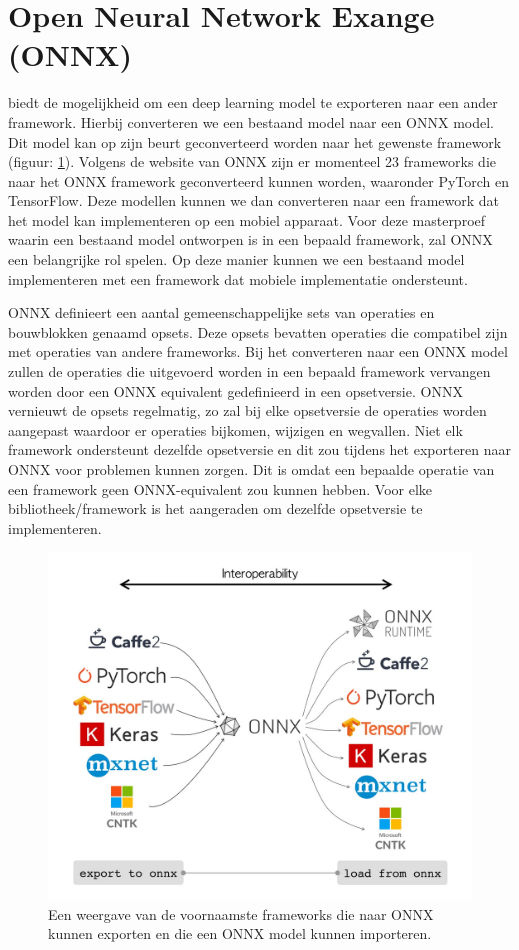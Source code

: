 \section{Open Neural Network Exange (ONNX)}
\cite{onnx_onnx_2017} biedt de mogelijkheid om een deep learning model te exporteren naar een ander framework.
Hierbij converteren we een bestaand model naar een ONNX model.
Dit model kan op zijn beurt geconverteerd worden naar het gewenste framework (figuur: \ref{fig:onnx}).
Volgens de website van ONNX zijn er momenteel 23 frameworks die naar het ONNX framework geconverteerd kunnen worden, waaronder PyTorch en TensorFlow.
Deze modellen kunnen we dan converteren naar een framework dat het model kan implementeren op een mobiel apparaat.
Voor deze masterproef waarin een bestaand model ontworpen is in een bepaald framework, zal ONNX een belangrijke rol spelen.
Op deze manier kunnen we een bestaand model implementeren met een framework dat mobiele implementatie ondersteunt.

ONNX definieert een aantal gemeenschappelijke sets van operaties en bouwblokken genaamd opsets.
Deze opsets bevatten operaties die compatibel zijn met operaties van andere frameworks.
Bij het converteren naar een ONNX model zullen de operaties die uitgevoerd worden in een bepaald framework vervangen worden door een ONNX equivalent gedefinieerd in een opsetversie.
ONNX vernieuwt de opsets regelmatig, zo zal bij elke opsetversie de operaties worden aangepast waardoor er operaties bijkomen, wijzigen en wegvallen.
Niet elk framework ondersteunt dezelfde opsetversie en dit zou tijdens het exporteren naar ONNX voor problemen kunnen zorgen.
Dit is omdat een bepaalde operatie van een framework geen ONNX-equivalent zou kunnen hebben.
Voor elke bibliotheek/framework is het aangeraden om dezelfde opsetversie te implementeren.

\begin{figure}[!ht]
    \centering
 	\includegraphics[width=0.7\linewidth]{fig/onnx.jpeg}
 	\caption{Een weergave van de voornaamste frameworks die naar ONNX kunnen exporten en die een ONNX model kunnen importeren.}
 	\label{fig:onnx}
\end{figure}

